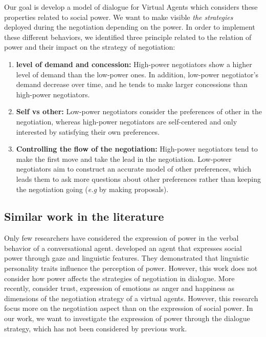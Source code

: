 \documentclass{llncs}
\begin{document}
		Our goal is develop a model of dialogue for Virtual Agents which considers these properties related to social power. We want to make visible \emph{the strategies} deployed during the negotiation depending on the power. In order to implement these different behaviors, we identified three principle related to the relation of power and their impact on the strategy of negotiation:
		\begin{enumerate}
			\item \textbf{level of demand and concession:} High-power negotiators show a higher level of demand than the low-power ones. In addition, low-power negotiator's demand decrease over time, and he tends to make larger concessions than high-power negotiators. \cite{de1995impact}
			
			\item \textbf{Self vs other:} Low-power negotiators consider the preferences of other in the negotiation, whereas high-power negotiators are self-centered and only interested by satisfying their own preferences. \cite{fiske1993controlling,de1995impact}
			
			\item \textbf{Controlling the flow of the negotiation:}
			High-power negotiators tend to make the first move \cite{magee2007power} and take the lead in the negotiation. Low-power negotiators aim to construct an accurate model of other preferences, which leads them to ask more questions about other preferences rather than keeping the negotiation going (\emph{e.g} by making proposals)\cite{de2004influence}. 
			
		\end{enumerate}
		\subsection{Similar work in the literature}
		Only few researchers have considered the expression of power in the verbal behavior of a conversational agent. \cite{bee2010bossy} developed an agent that expresses social power through gaze and linguistic features. They demonstrated that linguistic personality traits influence the perception of power. However, this work does not consider how power affects the strategies of negotiation in dialogue. More recently, \cite{traum2008multi,de2015humans} consider trust, expression of emotions as anger and happiness as dimensions of the negotiation strategy of a virtual agents. However, this research focus more on the negotiation aspect than on the expression of social power. In our work, we want to investigate the expression of power through the dialogue strategy, which has not been considered by previous work.
		
\end{document}
